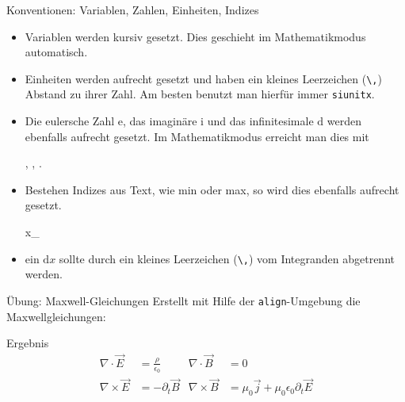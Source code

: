 \begin{frame}[fragile]{Konventionen: Variablen, Zahlen, Einheiten, Indizes}
  \begin{itemize}
    \item Variablen werden kursiv gesetzt.
      Dies geschieht im Mathematikmodus automatisch.
    \item Einheiten werden aufrecht gesetzt und haben ein kleines Leerzeichen (\verb+\,+) Abstand zu ihrer Zahl.
      Am besten benutzt man hierfür immer \texttt{siunitx}.
    \item Die eulersche Zahl $\mathrm{e}$, das imaginäre $\mathrm{i}$ und das infinitesimale $\mathrm{d}$ werden ebenfalls aufrecht gesetzt.
      Im Mathematikmodus erreicht man dies mit
      \begin{lstverbatim}
      , , .
      \end{lstverbatim}
    \item Bestehen Indizes aus Text, wie min oder max, so wird dies ebenfalls aufrecht gesetzt.
      \begin{lstverbatim}
      x_
      \end{lstverbatim}
    \item ein $\mathrm{d}x$ sollte durch ein kleines Leerzeichen (\verb+\,+) vom Integranden abgetrennt werden.
  \end{itemize}
\end{frame}

\begin{frame}{Übung: Maxwell-Gleichungen}
  Erstellt mit Hilfe der \texttt{align}-Umgebung die Maxwellgleichungen:
  \begin{block}{Ergebnis}
    \begin{align}
      \nabla \cdot \vec{E} &= \frac{\rho} {\epsilon_0} &
      \nabla \cdot \vec{B} &= 0 \\
      \nabla \times \vec{E} &= - \partial_t \vec{B} &
      \nabla \times \vec{B} &= \mu_0 \vec{j} + \mu_0 \epsilon_0 \partial_t \vec{E}
      \label{align}
    \end{align}
  \end{block}
\end{frame}

